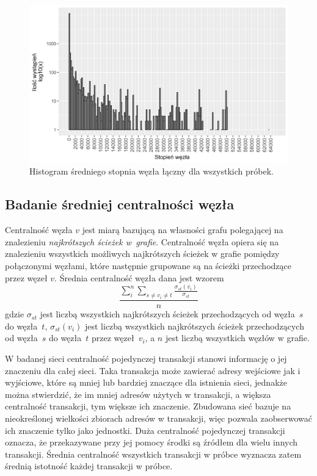 \documentclass[12pt, twoside, final, openany]{mgr}
\newcommand{\chartsWidth}{0.8}
\begin{document}
\begin{figure}[H]
   \includegraphics[width=\chartsWidth\linewidth]{pictures/sredni_stopien_wezla/sredni_stopien_wezla_hist.png}
   \caption{Histogram średniego stopnia węzła łączny dla wszystkich próbek.}
   \label{fig:sw3}
\end{figure}

\subsection{Badanie średniej centralności węzła}
\label{srednia_centralnosc}
\indent Centralność węzła $v$ jest miarą bazującą na własności grafu polegającej na znalezieniu \textit{najkrótszych ścieżek w~grafie}. Centralność węzła opiera się na znalezieniu wszystkich możliwych najkrótszych ścieżek w grafie pomiędzy połączonymi węzłami, które następnie grupowane są na ścieżki przechodzące przez węzeł $v$. Średnia centralność węzła dana jest wzorem 
\begin{equation}
\label{eq:centralnosc}
  \frac{\sum_i^n\sum_{s \ne v_i \ne t}^{}\frac{\sigma_{st}(v_i)}{\sigma_{st}}}{n}
\end{equation} 
gdzie $\sigma_{st}$ jest liczbą wszystkich najkrótszych ścieżek przechodzących od węzła~$s$ do węzła~$t$, $\sigma_{st}(v_i)$ jest liczbą wszystkich najkrótszych ścieżek przechodzących od węzła~$s$ do węzła~$t$ przez węzeł~$v_i$, a $n$ jest liczbą wszystkich węzłów w grafie\cite{barabasi2016network}.

\indent W badanej sieci centralność pojedynczej transakcji stanowi informację o jej znaczeniu dla całej sieci. Taka transakcja może zawierać adresy wejściowe jak i wyjściowe, które są mniej lub bardziej znaczące dla istnienia sieci, jednakże można stwierdzić, że im mniej adresów użytych w transakcji, a większa centralność transakcji, tym większe ich znaczenie. Zbudowana sieć bazuje na nieokreślonej wielkości zbiorach adresów w transakcji, więc pozwala zaobserwować ich znaczenie tylko jako jednostki. Duża centralność pojedynczej transakcji oznacza, że przekazywane przy jej pomocy środki są źródłem dla wielu innych transakcji. Średnia centralność wszystkich transakcji w próbce wyznacza zatem średnią istotność każdej transakcji w próbce.
\end{document}
